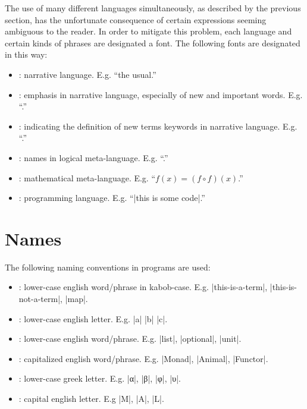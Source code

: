 The use of many different languages simultaneously, as described by the previous section, has the unfortunate consequence of certain expressions seeming ambiguous to the reader.
In order to mitigate this problem, each language and certain kinds of phrases are designated a font.
The following fonts are designated in this way:
\begin{itemize}
  \item {}: narrative language. E.g. ``the usual.''
  \item {}: emphasis in narrative language, especially of new and important words. E.g. ``.''
  \item {}: indicating the definition of new terms keywords in narrative language. E.g. ``.''
  \item {}: names in logical meta-language. E.g. ``.''
  \item {}: mathematical meta-language. E.g. ``$f(x) = (f \circ f)(x)$.''
  \item {}: programming language. E.g. ``\code|this is some code|.''
\end{itemize}

\section{Names}

The following naming conventions in programs are used:
\begin{itemize}
  \item {}: lower-case english word/phrase in kabob-case. E.g. \code|this-is-a-term|, \code|this-is-not-a-term|, \code|map|.
  \item {}: lower-case english letter. E.g. \code|a| \code|b| \code|c|.
  \item {}: lower-case english word/phrase. E.g. \code|list|, \code|optional|, \code|unit|.
  \item {}: capitalized english word/phrase. E.g. \code|Monad|, \code|Animal|, \code|Functor|.
  \item {}: lower-case greek letter. E.g. \code|α|, \code|β|, \code|φ|, \code|υ|.
  \item {}: capital english letter. E.g \code|M|, \code|A|, \code|L|.
\end{itemize}

